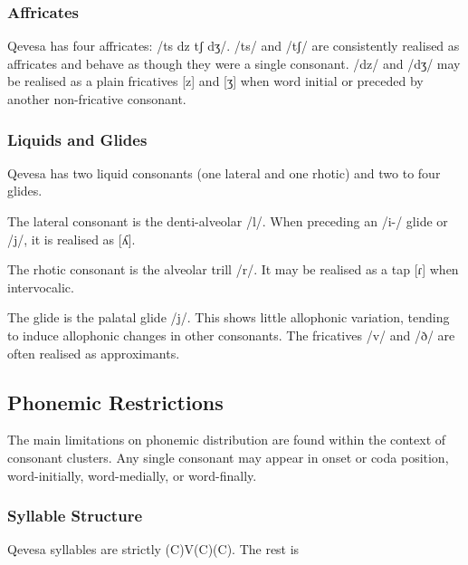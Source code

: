 \documentclass[grammar]{subfiles}
\begin{document}
\subsubsection{Affricates}
\label{sssec:affricates}

Qevesa has four affricates: /ts dz tʃ dʒ/.  /ts/ and /tʃ/ are consistently
realised as affricates and behave as though they were a single consonant.  /dz/
and /dʒ/ may be realised as a plain fricatives [z] and [ʒ] when word initial or
preceded by another non-fricative consonant.



\subsubsection{Liquids and Glides}
\label{sssec:liquids}

Qevesa has two liquid consonants (one lateral and one rhotic) and two to four
glides.

The lateral consonant is the denti-alveolar /l/.  When preceding an /i-/ glide
or /j/, it is realised as [ʎ].  %

The rhotic consonant is the alveolar trill /r/.  It may be realised as a tap
[ɾ] when intervocalic.  

The glide is the palatal glide /j/.  This shows little allophonic variation,
tending to induce allophonic changes in other consonants.  The fricatives /v/
and /ð/ are often realised as approximants.  


\subsection{Phonemic Restrictions}
\label{ssec:phonemic_restrictions}

The main limitations on phonemic distribution are found within the context of
consonant clusters.  Any single consonant may appear in onset or coda position,
word-initially, word-medially, or word-finally.  


\subsubsection{Syllable Structure}
\label{sssec:syllables}

Qevesa syllables are strictly (C)V(C)(C).  The rest is \tbw
\end{document}
